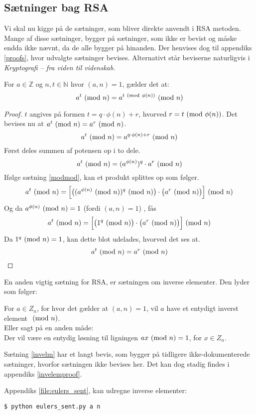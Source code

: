 \subsection{Sætninger bag RSA}
Vi skal nu kigge på de sætninger, som bliver direkte anvendt i RSA metoden.
Mange af disse sætninger, bygger på sætninger, som ikke er bevist og måske endda ikke nævnt, da de alle bygger på hinanden.
Der henvises dog til appendiks \ref{proofs}, hvor udvalgte sætninger bevises.
Alternativt står beviserne naturligvis i \textit{Kryptografi -- fra viden til videnskab}. \cite{krypto}

\begin{sent}
    \label{eulerssent}
    For \(a \in \mathbb{Z}\) og \(n, t \in \mathbb{N}\) hvor \((a, n) = 1\), gælder det at:
    \[a^t \ (\mathrm{mod}\ n) = a^{t \ (\mathrm{mod}\ \phi(n))} \ (\mathrm{mod}\ n)\]
\end{sent}

\begin{proof}
    \(t\) angives på formen \(t = q \cdot \phi(n) + r\), hvorved \(r = t \ (\mathrm{mod}\ \phi(n))\).
    Det bevises nu at \(a^t \ (\mathrm{mod}\ n) = a^r \ (\mathrm{mod}\ n)\).
    \[a^t \ (\mathrm{mod}\ n) = a^{q \cdot \phi(n) + r} \ (\mathrm{mod}\ n)\]
    Først deles summen af potensen op i to dele.
    \[a^t \ (\mathrm{mod}\ n) = (a^{\phi(n)})^q \cdot a^r \ (\mathrm{mod}\ n)\]
    Ifølge sætning \ref{modmod}, kan et produkt splittes op som følger.
    \[a^t \ (\mathrm{mod}\ n) = \Big[ \big( (a^{\phi(n)} \ (\mathrm{mod}\ n))^q \ (\mathrm{mod}\ n) \big) \cdot \big( a^r \ (\mathrm{mod}\ n) \big) \Big] \ (\mathrm{mod}\ n)\] %
    Og da \(a^{\phi(n)} \ (\mathrm{mod}\ n) = 1\) (fordi \((a, n) = 1\)) \cite[90]{krypto}, fås
    \[a^t \ (\mathrm{mod}\ n) = \Big[ \big( 1^q \ (\mathrm{mod}\ n) \big) \cdot \big( a^r \ (\mathrm{mod}\ n) \big) \Big] \ (\mathrm{mod}\ n)\]
    Da \(1^q \ (\mathrm{mod}\ n) = 1\), kan dette blot udelades, hvorved det ses at.
    \[a^t \ (\mathrm{mod}\ n) = a^r \ (\mathrm{mod}\ n)\]
\end{proof}

En anden vigtig sætning for RSA, er sætningen om inverse elementer. Den lyder som følger:

\begin{sent}
    \label{invelm}
    For \(a \in Z_n\), for hvor det gælder at \((a, n) = 1\), vil \(a\) have et entydigt inverst element \(\ (\mathrm{mod}\ n)\).\cite[93]{krypto}\\
    Eller sagt på en anden måde:\\
    Der vil være en entydig løsning til ligningen \(a x \ (\mathrm{mod}\ n) = 1\), for \(x \in Z_n\).
\end{sent}

Sætning \ref{invelm} har et langt bevis, som bygger på tidligere ikke-dokumenterede sætninger, hvorfor sætningen ikke bevises her. Det kan dog stadig findes i appendiks \ref{invelemproof}.

Appendiks \ref{file:eulers_sent}, kan udregne inverse elementer:
\begin{verbatim}
$ python eulers_sent.py a n
\end{verbatim}
